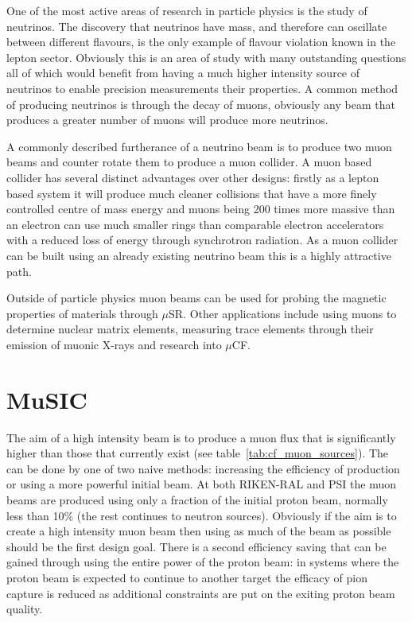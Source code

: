 One of the most active areas of research in particle physics is the study of neutrinos. The discovery that neutrinos have mass, and therefore can oscillate between different flavours, is the only example of flavour violation known in the lepton sector. Obviously this is an area of study with many outstanding questions all of which would benefit from having a much higher intensity source of neutrinos to enable precision measurements their properties. A common method of producing neutrinos is through the decay of muons, obviously any beam that produces a greater number of muons will produce more neutrinos.

A commonly described furtherance of a neutrino beam is to produce two muon beams and counter rotate them to produce a muon collider. A muon based collider has several distinct advantages over other designs: firstly as a lepton based system it will produce much cleaner collisions that have a more finely controlled centre of mass energy and muons being 200 times more massive than an electron can use much smaller rings than comparable electron accelerators with a reduced loss of energy through synchrotron radiation. As a muon collider can be built using an already existing neutrino beam this is a highly attractive path.

Outside of particle physics muon beams can be used for probing the magnetic properties of materials through \(\mu\)SR. Other applications include using muons to determine nuclear matrix elements, measuring trace elements through their emission of muonic X-rays and research into \(\mu\)CF.

\chapter{MuSIC} %
\label{cha:music}
The aim of a high intensity beam is to produce a muon flux that is significantly higher than those that currently exist (see table~\ref{tab:cf_muon_sources}). The can be done by one of two naive methods: increasing the efficiency of production or using a more powerful initial beam. At both RIKEN-RAL and PSI the muon beams are produced using only a fraction of the initial proton beam, normally less than 10\% (the rest continues to neutron sources). Obviously if the aim is to create a high intensity muon beam then using as much of the beam as possible should be the first design goal. There is a second efficiency saving that can be gained through using the entire power of the proton beam: in systems where the proton beam is expected to continue to another target the efficacy of pion capture is reduced as additional constraints are put on the exiting proton beam quality. 

